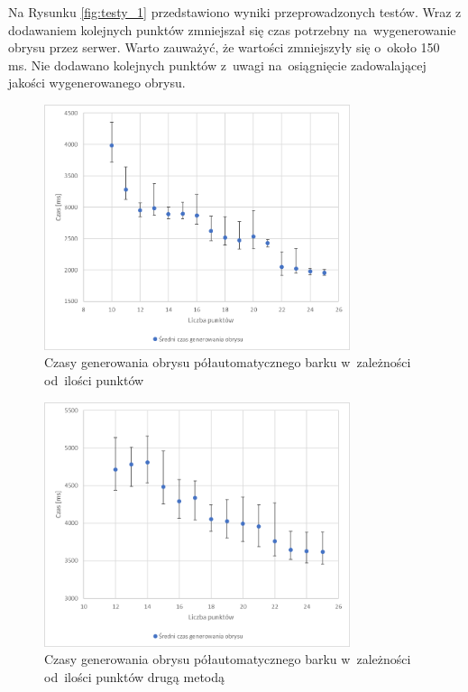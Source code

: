 \documentclass[a4paper,11pt,twoside,openright]{report}
\theoremstyle{definition}
\begin{document}
Na Rysunku \ref{fig:testy_1} przedstawiono wyniki przeprowadzonych testów. Wraz
z dodawaniem kolejnych punktów zmniejszał się czas potrzebny na~wygenerowanie
obrysu przez serwer. Warto zauważyć, że wartości zmniejszyły się o~około 150 ms.
Nie dodawano kolejnych punktów z~uwagi na~osiągnięcie zadowalającej jakości
wygenerowanego obrysu.

\begin{figure}[h!]
	\center
	\includegraphics[width=0.8\textwidth]{testy_2}
	\caption{Czasy generowania obrysu półautomatycznego barku w~zależności od~ilości punktów}
    	\label{fig:testy_2}
\end{figure}

\begin{figure}[htb!]
	\center
	\includegraphics[width=0.8\textwidth]{testy_3}
	\caption{Czasy generowania obrysu półautomatycznego barku w~zależności od~ilości punktów drugą metodą}
    	\label{fig:testy_3}
\end{figure}
\end{document}
